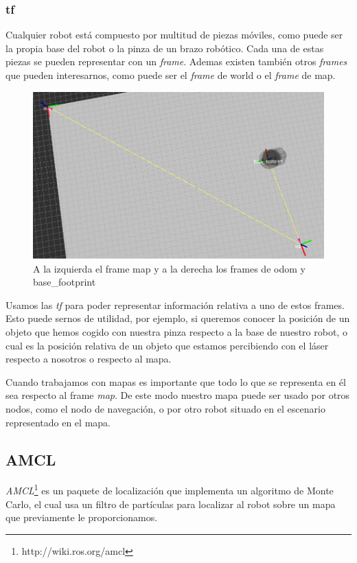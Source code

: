 \subsubsection{tf}
\label{subsubsec:tf}
Cualquier robot está compuesto por multitud de piezas móviles, como puede ser la propia base del robot o la pinza de un brazo robótico. Cada una de estas piezas se pueden representar con un \textit{frame}. Ademas existen también otros \textit{frames} que pueden interesarnos, como puede ser el \textit{frame} de world o el \textit{frame} de map.
\begin{figure} [hbtp]
  \begin{center}
    \includegraphics[width=12cm]{img/cap3/frames}
  \end{center}
  \caption{A la izquierda el frame map y a la derecha los frames de odom y base\_footprint}
  \label{fig:frames}
\end{figure}

Usamos las \textit{tf} para poder representar información relativa a uno de estos frames. Esto puede sernos de utilidad, por ejemplo, si queremos conocer la posición de un objeto que hemos cogido con nuestra pinza respecto a la base de nuestro robot, o cual es la posición relativa de un objeto que estamos percibiendo con el láser respecto a nosotros o respecto al mapa.

Cuando trabajamos con mapas es importante que todo lo que se representa en él sea respecto al frame \textit{map}. De este modo nuestro mapa puede ser usado por otros nodos, como el nodo de navegación, o por otro robot situado en el escenario representado en el mapa.


\subsection{AMCL}
\label{sec:amcl}
\textit{AMCL}\footnote{http://wiki.ros.org/amcl} es un paquete de localización que implementa un algoritmo de Monte Carlo, el cual usa un filtro de partículas para localizar al robot sobre un mapa que previamente le proporcionamos.
